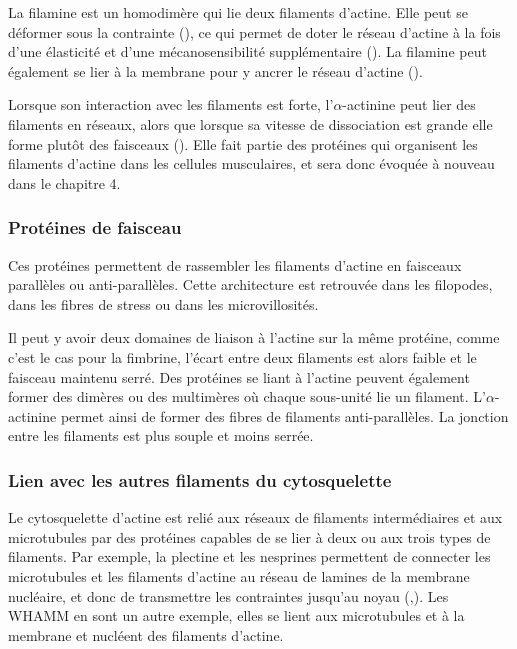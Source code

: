 La filamine est un homodimère qui lie deux filaments d'actine. Elle peut se déformer sous la contrainte (\cite{furuike_mechanical_2001}), ce qui permet de doter le réseau d'actine à la fois d'une élasticité et d'une mécanosensibilité supplémentaire (\cite{kainulainen_cell_2002}).
La filamine peut également se lier à la membrane pour y ancrer le réseau d'actine (\cite{yamazaki_section:_2002}).


Lorsque son interaction avec les filaments est forte, l'$\alpha$-actinine peut lier des filaments en réseaux, alors que lorsque sa vitesse de dissociation est grande elle forme plutôt des faisceaux (\cite{wachsstock_affinity_1993}). Elle fait partie des protéines qui organisent les filaments d'actine dans les cellules musculaires, et sera donc évoquée à nouveau dans le chapitre 4. 


\subsubsection{Protéines de faisceau}

Ces protéines permettent de rassembler les filaments d'actine en faisceaux parallèles ou anti-parallèles. Cette architecture est retrouvée dans les filopodes, dans les fibres de stress ou dans les microvillosités.

Il peut y avoir deux domaines de liaison à l'actine sur la même protéine, comme c'est le cas pour la fimbrine, l'écart entre deux filaments est alors faible et le faisceau maintenu serré. 
Des protéines se liant à l'actine peuvent également former des dimères ou des multimères où chaque sous-unité lie un filament. L'$\alpha$-actinine permet ainsi de former des fibres de filaments anti-parallèles. La jonction entre les filaments est plus souple et moins serrée. 

\subsubsection{Lien avec les autres filaments du cytosquelette}

Le cytosquelette d'actine est relié aux réseaux de filaments intermédiaires et aux microtubules par des protéines capables de se lier à deux ou aux trois types de filaments. 
Par exemple, la plectine et les nesprines permettent de connecter les microtubules et les filaments d'actine au réseau de lamines de la membrane nucléaire, et donc de transmettre les contraintes jusqu'au noyau (\cite{wiche_role_1998},\cite{tapley_connecting_2013}). 
Les WHAMM en sont un autre exemple, elles se lient aux microtubules et à la membrane et nucléent des filaments d'actine. 



